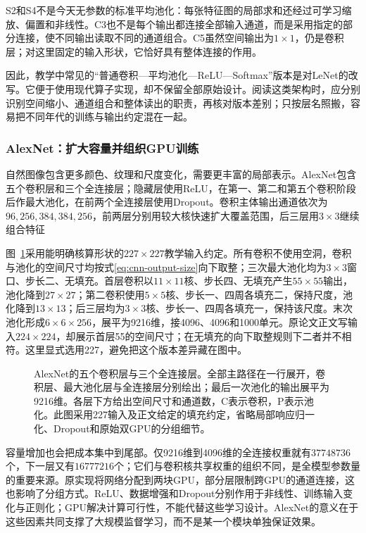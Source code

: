 S2和S4不是今天无参数的标准平均池化：每张特征图的局部求和还经过可学习缩放、偏置和非线性。C3也不是每个输出都连接全部输入通道，而是采用指定的部分连接，使不同输出读取不同的通道组合。C5虽然空间输出为$1\times1$，仍是卷积层；对这里固定的输入形状，它恰好具有整体连接的作用。

因此，教学中常见的“普通卷积—平均池化—ReLU—Softmax”版本是对LeNet的改写。它便于使用现代算子实现，却不保留全部原始设计。阅读这类架构时，应分别识别空间缩小、通道组合和整体读出的职责，再核对版本差别；只按层名照搬，容易把不同年代的训练与输出约定混在一起。

\FloatBarrier

\subsubsection{AlexNet：扩大容量并组织GPU训练}
\label{sec:cnn-alexnet}

自然图像包含更多颜色、纹理和尺度变化，需要更丰富的局部表示。AlexNet包含五个卷积层和三个全连接层；隐藏层使用ReLU，在第一、第二和第五个卷积阶段后作最大池化，在前两个全连接层使用Dropout。卷积主体输出通道依次为$96,256,384,384,256$，前两层分别用较大核快速扩大覆盖范围，后三层用$3\times3$继续组合特征

图~\ref{fig:cnn-alexnet}采用能明确核算形状的$227\times227$教学输入约定。所有卷积不使用空洞，卷积与池化的空间尺寸均按式\eqref{eq:cnn-output-size}向下取整；三次最大池化均为$3\times3$窗口、步长二、无填充。首层卷积以$11\times11$核、步长四、无填充产生$55\times55$输出，池化降到$27\times27$；第二卷积使用$5\times5$核、步长一、四周各填充二，保持尺度，池化降到$13\times13$；后三层均为$3\times3$核、步长一、四周各填充一，保持该尺度。末次池化形成$6\times6\times256$，展平为9216维，接4096、4096和1000单元。原论文正文写输入$224\times224$，却展示首层55的空间尺寸；在无填充的向下取整规则下二者并不相符。这里显式选用227，避免把这个版本差异藏在图中。

\begin{figure}[tbp]
  \centering
  
  \caption{AlexNet的五个卷积层与三个全连接层。全部主路径在一行展开，卷积层、最大池化层与全连接层分别绘出；最后一次池化的输出展平为9216维。各层下方给出空间尺寸和通道数，C表示卷积，P表示池化。此图采用227输入及正文给定的填充约定，省略局部响应归一化、Dropout和原始双GPU的分组细节。}
  \label{fig:cnn-alexnet}
\end{figure}

容量增加也会把成本集中到尾部。仅9216维到4096维的全连接权重就有$37748736$个，下一层又有$16777216$个；它们与卷积核共享权重的组织不同，是全模型参数量的重要来源。原实现将网络分配到两块GPU，部分层限制跨GPU的通道连接，这也影响了分组方式。ReLU、数据增强和Dropout分别作用于非线性、训练输入变化与正则化；GPU解决计算可行性，不能代替这些学习设计。AlexNet的意义在于这些因素共同支撑了大规模监督学习，而不是某一个模块单独保证效果。


